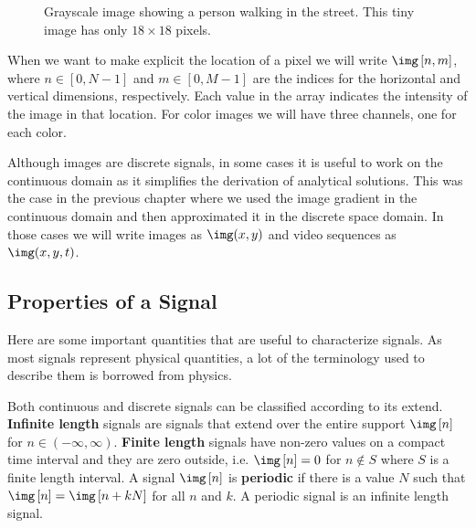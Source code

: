 \begin{figure}[h!]
{
	}
	\caption{Grayscale image showing a person walking in the street. This tiny image has only $18\times18$ pixels.}
\end{figure}


When we want to make explicit the location of a pixel we will write $\img \left[n, m \right]$, where $n \in \left[0,N-1 \right]$ and $m \in \left[0,M-1 \right]$ are the indices for the horizontal and vertical dimensions, respectively. Each value in the array indicates the intensity of the image in that location. For color images we will have three channels, one for each color.

Although images are discrete signals, in some cases it is useful to work on the continuous domain as it simplifies the derivation of analytical solutions. This was the case in the previous chapter where we used the image gradient in the continuous domain and then approximated it in the discrete space domain. In those cases we will write images as $\img (x,y)$ and video sequences as $\img (x,y,t)$.


%

\subsection{Properties of a Signal}

Here are some important quantities that are useful to characterize signals. As most signals represent physical quantities, a lot of the terminology used to describe them is borrowed from physics.

Both continuous and discrete signals can be classified according to its extend. {\bf Infinite length}
signals are signals that extend over the entire support $\img \left[n \right]$ for $n \in (-\infty, \infty)$. {\bf Finite length} 
signals have non-zero values on a compact time interval and they are zero outside, i.e. $\img \left[n \right] = 0$ for $n \notin S$ where $S$ is a finite length interval.
A signal $\img \left[n \right]$ is {\bf periodic}
if there is a value $N$ such that $\img \left[n \right] = \img \left[n + k N\right]$ for all $n$ and $k$. A periodic signal is an infinite length signal.


